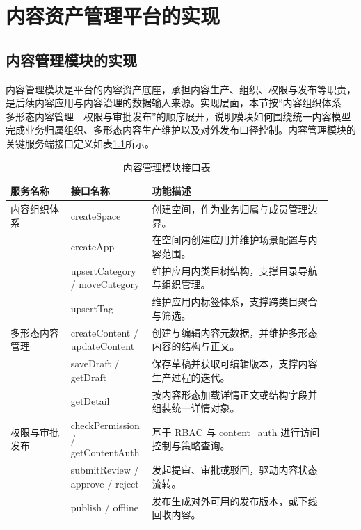 
\chapter{内容资产管理平台的实现}
\section{内容管理模块的实现}
\label{sec:impl_cm}

内容管理模块是平台的内容资产底座，承担内容生产、组织、权限与发布等职责，是后续内容应用与内容治理的数据输入来源。实现层面，本节按“内容组织体系—多形态内容管理—权限与审批发布”的顺序展开，说明模块如何围绕统一内容模型完成业务归属组织、多形态内容生产维护以及对外发布口径控制。内容管理模块的关键服务端接口定义如表\ref{tab:cm_api}所示。

\begin{table}[!htbp]
  \centering
  \caption{内容管理模块接口表}
  \label{tab:cm_api}
  \small
  \begin{tabular}{>{\raggedright\arraybackslash}p{0.18\linewidth}|>{\raggedright\arraybackslash}p{0.20\linewidth}|>{\raggedright\arraybackslash}p{0.54\linewidth}}
    \hline
    服务名称 & 接口名称 & 功能描述 \\ \hline
    内容组织体系 & createSpace & 创建空间，作为业务归属与成员管理边界。 \\ \cline{2-3}
     & createApp & 在空间内创建应用并维护场景配置与内容范围。 \\ \cline{2-3}
     & upsertCategory / moveCategory & 维护应用内类目树结构，支撑目录导航与组织管理。 \\ \cline{2-3}
     & upsertTag & 维护应用内标签体系，支撑跨类目聚合与筛选。 \\ \hline
    多形态内容管理 & createContent / updateContent & 创建与编辑内容元数据，并维护多形态内容的结构与正文。 \\ \cline{2-3}
     & saveDraft / getDraft & 保存草稿并获取可编辑版本，支撑内容生产过程的迭代。 \\ \cline{2-3}
     & getDetail & 按内容形态加载详情正文或结构字段并组装统一详情对象。 \\ \hline
    权限与审批发布 & checkPermission / getContentAuth & 基于 RBAC 与 content\_auth 进行访问控制与策略查询。 \\ \cline{2-3}
     & submitReview / approve / reject & 发起提审、审批或驳回，驱动内容状态流转。 \\ \cline{2-3}
     & publish / offline & 发布生成对外可用的发布版本，或下线回收内容。 \\ \hline
  \end{tabular}
\end{table}

